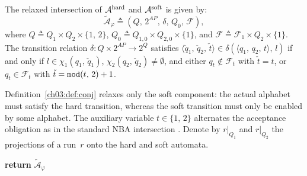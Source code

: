 \begin{definition}\label{ch03:def:conj}
The relaxed intersection of $\mathcal{A}^{\textup{hard}}$ and
$\mathcal{A}^{\textup{soft}}$ is given by:
\begin{equation}
\tilde{\mathcal{A}}_{\varphi}
\triangleq
(Q,\, 2^{AP},\, \delta,\, Q_0,\, \mathcal{F}),
\label{ch03:eq:intersect}
\end{equation}
where
$Q \triangleq Q_1 \times Q_2 \times \{1,\, 2\}$,
$Q_0 \triangleq Q_{1,0} \times Q_{2,0} \times \{1\}$, and
$\mathcal{F} \triangleq \mathcal{F}_1 \times Q_2 \times \{1\}$. The transition
relation $\delta : Q \times 2^{AP} \rightarrow 2^Q$ satisfies
$\langle \check{q}_1,\, \check{q}_2,\, \check{t} \rangle \in
\delta(\langle q_1,\, q_2,\, t \rangle,\, l)$ if and only if
$l \in \chi_1(q_1,\, \check{q}_1)$,
$\chi_2(q_2,\, \check{q}_2) \neq \emptyset$, and either
$q_t \notin \mathcal{F}_t$ with $\check{t} = t$, or
$q_t \in \mathcal{F}_t$ with
$\check{t} = \textup{\texttt{mod}}(t,\, 2) + 1$.
\end{definition}

Definition~\ref{ch03:def:conj} relaxes only the soft component: the actual
alphabet must satisfy the hard transition, whereas the soft transition must
only be enabled by some alphabet. The auxiliary variable $t \in \{1,\, 2\}$
alternates the acceptance obligation as in the standard NBA intersection
\citep{baier2008principles}. Denote by $r|_{Q_1}$ and $r|_{Q_2}$ the projections
of a run~$r$ onto the hard and soft automata.

\begin{algorithm}[t]
\DontPrintSemicolon
\caption{Construction of the relaxed intersection, \texttt{RelaxInt}()}
\label{ch03:alg:relaxedint}

\textbf{return} $\tilde{\mathcal{A}}_{\varphi}$
\end{algorithm}

